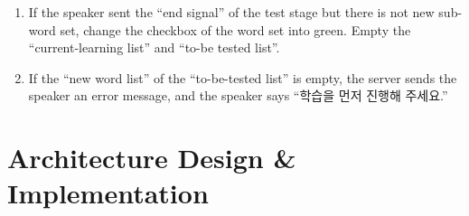 \documentclass[conference]{IEEEtran}
\begin{document}
\begin{enumerate}
\begin{enumerate}
\begin{enumerate}
            \item If the speaker sent the “end signal” of the test stage but there is not new sub-word set, change the checkbox of the word set into green. Empty the “current-learning list” and “to-be tested list”.
            \item If the “new word list” of the “to-be-tested list” is empty, the server sends the speaker an error message, and the speaker says “학습을 먼저 진행해 주세요.”
        \end{enumerate} 
    \end{enumerate}
\end{enumerate}






\section{Architecture Design \& Implementation}
\end{document}
